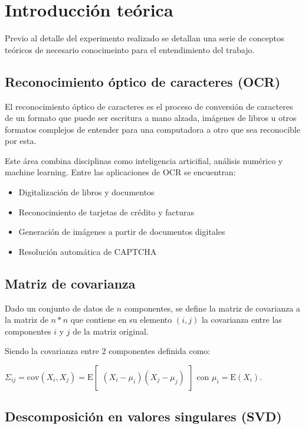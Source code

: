 \section{Introducci\'on te\'orica}

Previo al detalle del experimento realizado se detallan una serie de conceptos te\'oricos de necesario
conocimeinto para el entendimiento del trabajo.

\subsection{Reconocimiento \'optico de caracteres (OCR)}

El reconocimiento \'optico de caracteres es el proceso de conversi\'on de caracteres de un formato que puede
ser escritura a mano alzada, im\'agenes de libros u otros formatos complejos de entender para una computadora
a otro que sea reconocible por esta.

Este \'area combina disciplinas como inteligencia articifial, an\'alisis num\'erico y machine learning. Entre
las aplicaciones de OCR se encuentran:

\begin{itemize}
  \item Digitalizaci\'on de libros y documentos
  \item Reconocimiento de tarjetas de cr\'edito y facturas
  \item Generaci\'on de im\'agenes a partir de documentos digitales
  \item Resoluci\'on autom\'atica de CAPTCHA
\end{itemize}

\subsection{Matriz de covarianza}

Dado un conjunto de datos de $n$ componentes, se define la matriz de covarianza a la matriz de $n*n$ que
contiene en su elemento $(i, j)$ la covarianza entre las componentes $i$ y $j$ de la matriz original.

Siendo la covarianza entre 2 componentes definida como:
\\

\centerline{$\Sigma_{ij} = \mathrm{cov}(X_i, X_j) = \mathrm{E}\begin{bmatrix}(X_i - \mu_i)(X_j - \mu_j) \end{bmatrix}$ con $\mu_i = \mathrm{E}(X_i)$.}

\subsection{Descomposici\'on en valores singulares (SVD)}

